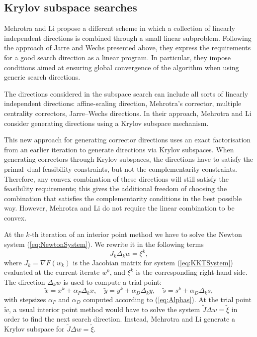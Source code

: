 %
%
\subsection{Krylov subspace searches}
\label{sec:MehrotraLi}

Mehrotra and Li \cite{MehrotraLi} propose a different 
scheme in which a collection of linearly 
independent directions is combined through a small linear subproblem.
Following the approach of Jarre and Wechs \cite{JarreWechs}
presented above,
they express the requirements for a good search direction as a linear 
program. In particular, they impose conditions aimed at ensuring 
global convergence of the algorithm when using generic search directions.

The directions considered in the subspace search can include all 
sorts of linearly independent directions: affine-scaling direction, 
Mehrotra's corrector, multiple centrality correctors, Jarre--Wechs 
directions. 
In their approach, Mehrotra and Li \cite{MehrotraLi}
consider generating directions using a Krylov subspace mechanism.

This new approach for generating corrector directions uses an exact 
factorisation from an earlier iteration to generate directions 
via Krylov subspaces. 
When generating correctors through Krylov subspaces, the directions 
have to satisfy the primal--dual feasibility constraints, but not 
the complementarity constraints. Therefore, any convex combination 
of these directions will still satisfy the feasibility requirements; 
this gives the additional freedom of choosing the combination that 
satisfies the complementarity conditions in the best possible way. 
However, Mehrotra and Li \cite{MehrotraLi} do not require 
the linear combination to be convex.

At the $k$-th iteration of an interior point method we have to solve 
the Newton system (\ref{eq:NewtonSystem}).
We rewrite it in the following terms
\[
   J_k \Delta_k w = \xi^k, 
\]
where 
$J_k = \nabla F(w_k)$ is the Jacobian matrix for system
(\ref{eq:KKTSystem}) evaluated at the current iterate $w^k$,
and $\xi^k$ is the corresponding right-hand side.
%
The direction $\Delta_k w$ is used to compute a trial point:
\[
\tilde{x} = x^k + \alpha_P \Delta_k x, \quad
\tilde{y} = y^k + \alpha_D \Delta_k y, \quad
\tilde{s} = s^k + \alpha_D \Delta_k s,
\]
with stepsizes $\alpha_P$ and $\alpha_D$ computed according
to (\ref{eq:Alphas}).
At the trial point $\tilde w$, a usual 
interior point method would have to solve the system
$\tilde J \Delta w = \tilde \xi$
in order to find the next search direction. Instead, 
Mehrotra and Li \cite{MehrotraLi} generate a Krylov subspace 
for $\tilde J \Delta w = \tilde \xi$.

